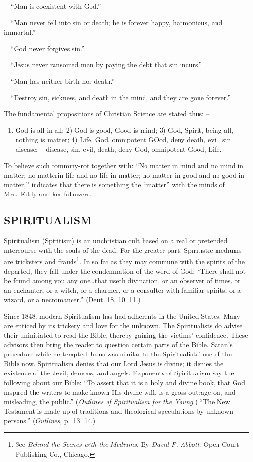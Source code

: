 \documentclass[
]{book}
\providecommand{\tightlist}{%
  \setlength{\itemsep}{0pt}\setlength{\parskip}{0pt}}
\begin{document}
~~``Man is coexistent with God.''

~~``Man never fell into sin or death; he is forever happy, harmonious, and immortal.''

~~``God never forgives sin.''

~~``Jesus never ransomed man by paying the debt that sin incurs.''

~~``Man has neither birth nor death.''

~~``Destroy sin, sickness, and death in the mind, and they are gone forever.''

The fundamental propositions of Christian Science are stated thus: --

\begin{enumerate}
\def\labelenumi{\arabic{enumi})}
\tightlist
\item
  God is all in all; 2) God is good, Good is mind; 3) God, Spirit, being all, nothing is matter; 4) Life, God, omnipotent GOod, deny death, evil, sin disease; -- disease, sin, evil, death, deny God, omnipotent Good, Life.
\end{enumerate}

To believe such tommmy-rot together with: ``No matter in mind and no mind in matter; no matterin life and no life in matter; no matter in good and no good in matter,'' indicates that there is something the ``matter'' with the minds of Mrs.~Eddy and her followers.

\subsection{SPIRITUALISM}\label{spiritualism}

Spiritualism (Spiritism) is an unchristian cult based on a real or pretended intercourse with the souls of the dead. For the greater part, Spiritistic mediums are tricksters and frauds\footnote{See \emph{Behind the Scenes with the Mediums}. By \emph{David P. Abbott.} Open Court Publishing Co., Chicago.}. In so far as they may commune with the spirits of the departed, they fall under the condemnation of the word of God: ``There shall not be found among you any one\ldots that useth divination, or an observer of times, or an enchanter, or a witch, or a charmer, or a consulter with familiar spirits, or a wizard, or a necromancer.'' (Deut. 18, 10. 11.)

Since 1848, modern Spiritualism has had adherents in the United States. Many are enticed by its trickery and love for the unknown. The Spiritualists do advise their uninitiated to read the Bible, thereby gaining the victims' confidence. These advisors then bring the reader to question certain parts of the Bible. Satan's procedure while he tempted Jesus was similar to the Spiritualists' use of the Bible now. Spiritualism denies that our Lord Jesus is divine; it denies the existence of the devil, demons, and angels. Exponents of Spiritualism say the following about our Bible: ``To assert that it is a holy and divine book, that God inspired the writers to make known His divine will, is a gross outrage on, and misleading, the public.'' (\emph{Outlines of Spiritualism for the Young}.) ``The New Testament is made up of traditions and theological speculations by unknown persons.'' (\emph{Outlines}, p.~13. 14.)
\end{document}

